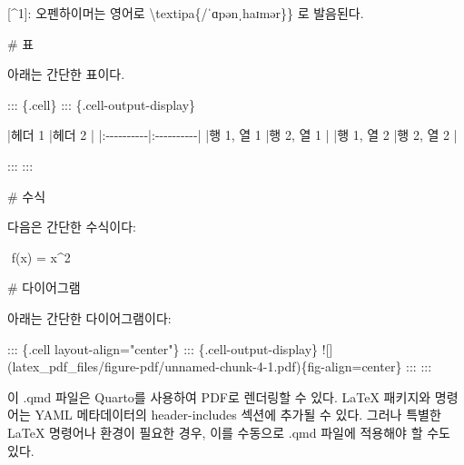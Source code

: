 \documentclass[
  letterpaper,
]{book}
\newenvironment{Shaded}{\begin{snugshade}}{\end{snugshade}}
\newcommand{\CommentTok}[1]{\textcolor[rgb]{0.37,0.37,0.37}{#1}}
\newcommand{\DataTypeTok}[1]{\textcolor[rgb]{0.68,0.00,0.00}{#1}}
\newcommand{\ErrorTok}[1]{\textcolor[rgb]{0.68,0.00,0.00}{#1}}
\newcommand{\ExtensionTok}[1]{\textcolor[rgb]{0.00,0.23,0.31}{#1}}
\newcommand{\KeywordTok}[1]{\textcolor[rgb]{0.00,0.23,0.31}{#1}}
\newcommand{\NormalTok}[1]{\textcolor[rgb]{0.00,0.23,0.31}{#1}}
\newcommand{\StringTok}[1]{\textcolor[rgb]{0.13,0.47,0.30}{#1}}
\newcommand{\VariableTok}[1]{\textcolor[rgb]{0.07,0.07,0.07}{#1}}
\begin{document}
\begin{Shaded}
\begin{Highlighting}[]
\ExtensionTok{[\^{}1]:}\NormalTok{ 오펜하이머는 영어로 }\DataTypeTok{\textbackslash{}t}\NormalTok{extipa\{/ˈɑpənˌhaɪmər\}\} 로 발음된다.}



\CommentTok{\# 표}

\ExtensionTok{아래는}\NormalTok{ 간단한 표이다.}

\ExtensionTok{:::}\NormalTok{ \{.cell\}}
\ExtensionTok{:::}\NormalTok{ \{.cell{-}output{-}display\}}


\KeywordTok{|}\ExtensionTok{헤더}\NormalTok{ 1     }\KeywordTok{|}\ExtensionTok{헤더}\NormalTok{ 2     }\KeywordTok{|}
\KeywordTok{|}\ExtensionTok{:{-}{-}{-}{-}{-}{-}{-}{-}{-}{-}}\KeywordTok{|}\ExtensionTok{:{-}{-}{-}{-}{-}{-}{-}{-}{-}{-}}\KeywordTok{|}
\KeywordTok{|}\ExtensionTok{행}\NormalTok{ 1, 열 1 }\KeywordTok{|}\ExtensionTok{행}\NormalTok{ 2, 열 1 }\KeywordTok{|}
\KeywordTok{|}\ExtensionTok{행}\NormalTok{ 1, 열 2 }\KeywordTok{|}\ExtensionTok{행}\NormalTok{ 2, 열 2 }\KeywordTok{|}


\ExtensionTok{:::}
\ExtensionTok{:::}


\CommentTok{\# 수식}

\ExtensionTok{다음은}\NormalTok{ 간단한 수식이다:}

\VariableTok{$$}
  \ExtensionTok{f}\ErrorTok{(}\ExtensionTok{x}\KeywordTok{)} \ExtensionTok{=}\NormalTok{ x\^{}2}
\VariableTok{$$}

\CommentTok{\# 다이어그램}

\ExtensionTok{아래는}\NormalTok{ 간단한 다이어그램이다:}

\ExtensionTok{:::}\NormalTok{ \{.cell layout{-}align=}\StringTok{"center"}\NormalTok{\}}
\ExtensionTok{:::}\NormalTok{ \{.cell{-}output{-}display\}}
\ExtensionTok{![]}\ErrorTok{(}\ExtensionTok{latex\_pdf\_files/figure{-}pdf/unnamed{-}chunk{-}4{-}1.pdf}\KeywordTok{)}\ExtensionTok{\{fig{-}align=}\StringTok{\textquotesingle{}center\textquotesingle{}}\ExtensionTok{\}}
\ExtensionTok{:::}
\ExtensionTok{:::}

\ExtensionTok{이} \KeywordTok{\textasciigrave{}}\ExtensionTok{.qmd}\KeywordTok{\textasciigrave{}}\NormalTok{ 파일은 Quarto를 사용하여 PDF로 렌더링할 수 있다. LaTeX 패키지와 명령어는 YAML 메타데이터의 }\KeywordTok{\textasciigrave{}}\ExtensionTok{header{-}includes}\KeywordTok{\textasciigrave{}}\NormalTok{ 섹션에 추가될 수 있다. 그러나 특별한 LaTeX 명령어나 환경이 필요한 경우, 이를 수동으로 }\KeywordTok{\textasciigrave{}}\ExtensionTok{.qmd}\KeywordTok{\textasciigrave{}}\NormalTok{ 파일에 적용해야 할 수도 있다.}
\end{Highlighting}
\end{Shaded}
\end{document}
